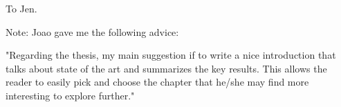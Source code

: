 \bigskip

${}$ \\

\bigskip

${}$ \\

\bigskip

${}$ \\

\bigskip

\begin{center}
\begin{Large}
To Jen.

\bigskip

Note: Joao gave me the following advice: 

\bigskip

"Regarding the thesis, my main suggestion if to write a nice introduction that talks about state of the art and summarizes the key results. This allows the reader to easily pick and choose the chapter that he/she may find more interesting to explore further."

\end{Large}
\end{center}